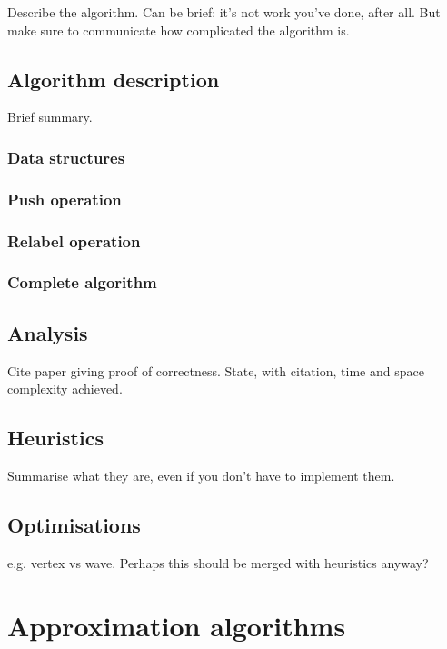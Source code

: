 Describe the algorithm. Can be brief: it's not work you've done, after all. But make sure to communicate how complicated the algorithm is.

\subsection{Algorithm description}

Brief summary.

\subsubsection{Data structures}

\subsubsection{Push operation}

\subsubsection{Relabel operation}

\subsubsection{Complete algorithm}

\subsection{Analysis}

Cite paper giving proof of correctness. State, with citation, time and space complexity achieved.

\subsection{Heuristics}

Summarise what they are, even if you don't have to implement them.

\subsection{Optimisations}

e.g. vertex vs wave. Perhaps this should be merged with heuristics anyway?

\section{Approximation algorithms} \label{sec:impl-approx}

